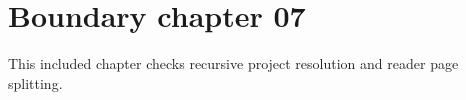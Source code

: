 \section{Boundary chapter 07}
\label{sec:boundary-07}
This included chapter checks recursive project resolution and reader page splitting.
